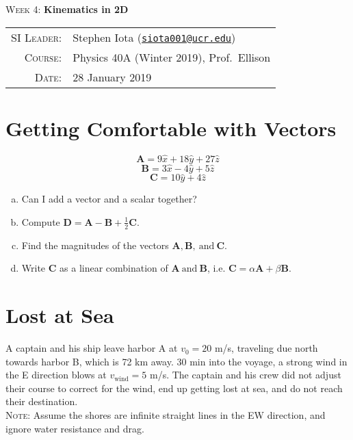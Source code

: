 \documentclass[10pt]{article}
\newcommand{\email}[1]{\texttt{\href{mailto:#1}{#1}}}
\begin{document}
\begin{center}

\Large{\textsc{Week 4}: \textbf{Kinematics in 2D}}

\end{center}

\vspace{.5mm}



\begin{tabular}{rl}
\textsc{SI Leader}:
&
Stephen Iota (\email{siota001@ucr.edu})
\\
\textsc{Course}:
&
Physics 40A (Winter 2019), Prof.~Ellison
\\
\textsc{Date}:
&
28 January 2019
\end{tabular}



\section{Getting Comfortable with Vectors}
\begin{equation*}
	\mathbf{A} = 9 \hat{x} + 18 \hat{y} + 27 \hat{z}
\end{equation*}
\begin{equation*}
	\mathbf{B} = 3 \hat{x} - 4 \hat{y} + 5 \hat{z}
\end{equation*}
\begin{equation*}
	\mathbf{C} =  10 \hat{y} + 4 \hat{z}
\end{equation*}

\begin{enumerate}[(a)]
	\item Can I add a vector and a scalar together?
	\item Compute $\mathbf{D} = \mathbf{A} - \mathbf{B} + \frac{1}{2}\mathbf{C}$.
	\item Find the magnitudes of the vectors $\mathbf{A}, \mathbf{B}, \ \mathrm{and} \ \mathbf{C}.$
	\item Write $\mathbf{C}$ as a linear combination of $\mathbf{A} \ \mathrm{and} \ \mathbf{B}$, i.e. $ \mathbf{C} = \alpha\mathbf{A} + \beta\mathbf{B}.$

\end{enumerate}

\section{Lost at Sea}
A captain and his ship leave harbor A at $v_0= 20$ m/s, traveling due north towards harbor B, which is 72 km away. 30 min into the voyage, a strong wind in the E direction blows at $v_{\mathrm{wind}} = 5$ m/s. The captain and his crew did not adjust their course to correct for the wind, end up getting lost at sea, and do not reach their destination. 
\\
\textsc{Note:} Assume the shores are infinite straight lines in the EW direction, and ignore water resistance and drag.
\end{document}
